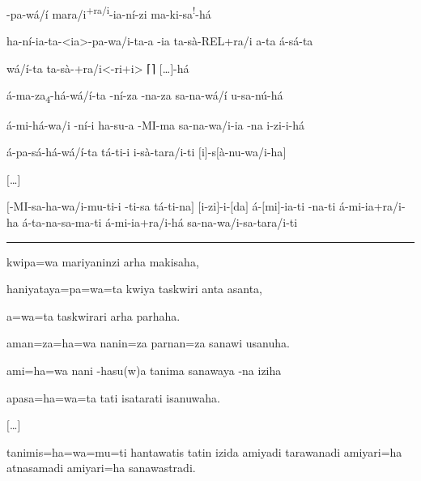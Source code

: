 \clearpage
\setcounter{parcount}{10}
\begin{parnumbersr}

	\raggedright%
	\itshape%


	-pa-wá/í \lmasc{}mara/i\textsuperscript{+ra/i}-ia-ní-zi
	\lmasc{} \lmasc{}ma-ki-sa\textsuperscript{!}-há \lmasc{}\lmasc{}


	\lmasc{}ha-ní-ia-ta-<ia>-pa-wa/i-ta-a \lmasc{}-ia
	\lmasc{}ta-sà-REL+ra/i \lmasc{}a-ta \lmasc{}á-sá-ta


	\lmasc{}wá/í-ta ta-sà-+ra/i<-ri+i>
	 \lmasc{}\textsc{⌈}\textsc{⌉} $[$…$]$-há

	\lmasc{}á-ma\lmasc{}\lmasc{}-za\textsubscript{4}-há-wá/í-ta
	\lmasc{}-ní-za
	\lmasc{}-na-za \lmasc{}sa-na-wá/í
	\lmasc{}u-sa-nú-há

	\lmasc{}á-mi-há-wa/i \lmasc{}-ní-i
	\lmasc{}ha-su-a \lmasc{}-MI-ma
	\lmasc{}\lmasc{} sa-na-wa/i-ia
	\lmasc{}-na i-zi-i-há

	\lmasc{}á-pa-sá-há-wá/í-ta \lmasc{}tá-ti-i
	\lmasc{}i-sà-tara/i-ti
	\lmasc{}$[$i$]$-s$[$à-nu-wa/i-ha$]$

	$[$\ldots$]$

	$[$\lmasc{}-MI-sa-ha-wa/i-mu-ti-i -ti-sa
					\lmasc{}tá-ti-na$]$ \lmasc{}$[$i-zi$]$-i-$[$da$]$
	\lmasc{}á-$[$mi$]$-ia-ti
	\lmasc{}-na-ti \lmasc{}á-mi-ia+ra/i-ha
	\lmasc{}á-ta-na-sa-ma-ti \lmasc{}á-mi-ia+ra/i-há
	\lmasc{}\lmasc{} \lmasc{}sa-na-wa/i-sa-tara/i-ti



\end{parnumbersr}

\vspace{10pt}
\hrule
\vspace{10pt}

\setcounter{parcount}{10}
\begin{parnumbersr}

	\raggedright%
	\itshape%

	kwipa=wa mariyaninzi arha makisaha,

	haniyataya=pa=wa=ta kwiya taskwiri anta asanta,

	a=wa=ta taskwirari arha parhaha.

	aman=za=ha=wa nanin=za parnan=za sanawi usanuha.

	ami=ha=wa nani -hasu{(w)}a tanima sanawaya -na iziha

	apasa=ha=wa=ta tati isatarati isanuwaha.

	$[$\ldots{}$]$

	tanimis=ha=wa=mu=ti hantawatis tatin izida amiyadi tarawanadi amiyari=ha
	atnasamadi amiyari=ha sanawastradi.

\end{parnumbersr}

